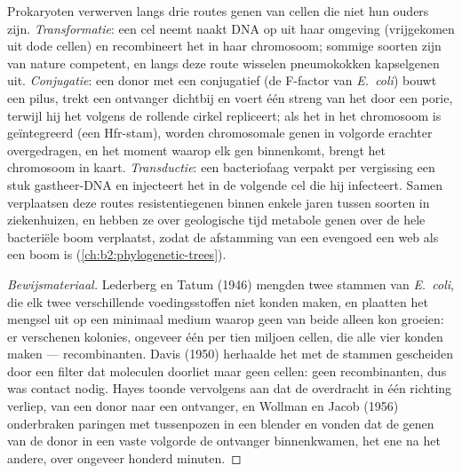 \begin{definition}\label{def:b2:genome-diversification:hgt}
Prokaryoten verwerven langs drie routes genen van cellen die niet hun
ouders zijn. \emph{Transformatie}: een cel neemt naakt DNA op uit haar
omgeving (vrijgekomen uit dode cellen) en recombineert het in haar
chromosoom; sommige soorten zijn van nature competent, en langs deze
route wisselen pneumokokken kapselgenen uit. \emph{Conjugatie}: een
donor met een conjugatief  (de F-factor van \emph{E.~coli})
bouwt een pilus, trekt een ontvanger dichtbij en voert één streng van
het  door een porie, terwijl hij het volgens de rollende cirkel
repliceert; als het  in het chromosoom is geïntegreerd (een
Hfr-stam), worden chromosomale genen in volgorde erachter overgedragen,
en het moment waarop elk gen binnenkomt, brengt het chromosoom in kaart.
\emph{Transductie}: een bacteriofaag verpakt per vergissing een stuk
gastheer-DNA en injecteert het in de volgende cel die hij infecteert.
Samen verplaatsen deze routes resistentiegenen binnen enkele jaren
tussen soorten in ziekenhuizen, en hebben ze over geologische tijd
metabole genen over de hele bacteriële boom verplaatst, zodat de afstamming
van een  evengoed een web als een boom is
(\cref{ch:b2:phylogenetic-trees}).
\end{definition}
\begin{proof}[Bewijsmateriaal]
Lederberg en Tatum (1946) mengden twee stammen van \emph{E.~coli}, die
elk twee verschillende voedingsstoffen niet konden maken, en plaatten het
mengsel uit op een minimaal medium waarop geen van beide alleen kon
groeien: er verschenen kolonies, ongeveer één per tien miljoen cellen,
die alle vier konden maken --- recombinanten. Davis (1950) herhaalde het
met de stammen gescheiden door een filter dat moleculen doorliet maar
geen cellen: geen recombinanten, dus was contact nodig. Hayes toonde
vervolgens aan dat de overdracht in één richting verliep, van een donor
naar een ontvanger, en Wollman en Jacob (1956) onderbraken paringen met
tussenpozen in een blender en vonden dat de genen van de donor in een
vaste volgorde de ontvanger binnenkwamen, het ene na het andere, over
ongeveer honderd minuten.
\end{proof}

